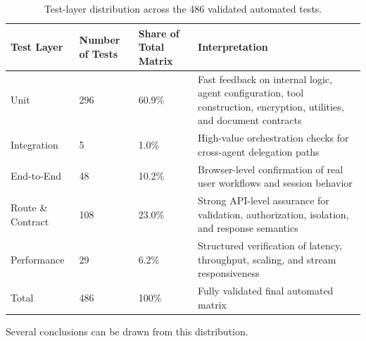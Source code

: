 \documentclass[11pt,a4paper]{report}
\begin{document}
\begin{table}[H]
\centering
\begin{tabular}{@{}L{3cm} C{2.5cm} C{2.5cm} L{5.5cm}@{}}
\toprule
\textbf{Test Layer} & \textbf{Number of Tests} & \textbf{Share of Total Matrix} & \textbf{Interpretation}\\
\midrule
Unit               & 296 & 60.9\% & Fast feedback on internal logic, agent configuration, tool construction, encryption, utilities, and document contracts\\
Integration        & 5   & 1.0\%  & High-value orchestration checks for cross-agent delegation paths\\
End-to-End         & 48  & 10.2\% & Browser-level confirmation of real user workflows and session behavior\\
Route \& Contract  & 108 & 23.0\% & Strong API-level assurance for validation, authorization, isolation, and response semantics\\
Performance        & 29  & 6.2\%  & Structured verification of latency, throughput, scaling, and stream responsiveness\\
\midrule
Total              & 486 & 100\%  & Fully validated final automated matrix\\
\bottomrule
\end{tabular}
\caption{Test-layer distribution across the 486 validated automated tests.}
\end{table}

Several conclusions can be drawn from this distribution.
\end{document}
